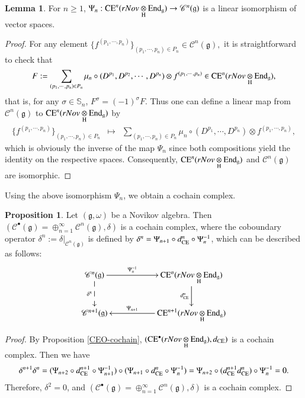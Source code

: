 \documentclass[12pt]{amsart}
\theoremstyle{definition}
\newtheorem{lem}[thm]{Lemma}
\newtheorem{pro}[thm]{Proposition}
\newcommand{\g}{\mathfrak g}
\newcommand{\End}{\mathrm{End}}
\newcommand{\ot}{\otimes}
\newcommand{\ceo}{{\rm CE}^{\bullet}}
\newcommand{\ce}{{\rm CE}}
\newcommand{\scrC}{{\mathscr{C}}}
\begin{document}
\begin{lem}\label{Psi}
For $n\geq 1$,   $\Psi_n: \ce^n(rNov\underset{\rm H}{\ot}\End_\g)\to \scrC^n(\g)$ is a linear isomorphism of vector spaces.
\end{lem}
\begin{proof}
For any element
$\bigl\{ f^{(p_1,\cdots,p_n)} \bigr\}_{(p_1,\cdots,p_n)\in P_n}\in\scrC^n(\g),$
it is straightforward to check that
$$
F:=\sum_{(p_1,\cdots,p_n)\in P_n} \mu_n\circ(D^{p_1},D^{p_2},\cdots,D^{p_n})\otimes f^{(p_1,\cdots,p_n)}\in\ce^n(rNov\underset{\rm H}{\otimes}\End_\g),
$$
that is, for any $\sigma\in\mathbb{S}_n$,
$F^\sigma=(-1)^\sigma F.$
Thus one can define a linear map from $\scrC^n(\g)$ to $\ce^n(rNov\underset{\rm H}{\ot}\End_\g)$ by
\begin{eqnarray*}
\{f^{(p_1,\cdots,p_n)}\}_{(p_1,\cdots,p_n)\in P_n}&\mapsto&\sum_{(p_1,\cdots,p_n)\in P_n} \mu_n\circ(D^{p_1},\cdots,D^{p_n})\otimes f^{(p_1,\cdots,p_n)},
\end{eqnarray*}
which is obviously the inverse of the map $\Psi_n$ since both compositions yield the identity on the respective spaces. Consequently, $\ce^n(rNov\underset{\rm H}{\ot}\End_\g)$ and $\scrC^n(\g)$ are isomorphic.
\end{proof}

Using the above isomorphism $\Psi_n$, we obtain a cochain complex.
\begin{pro}\label{scrC-cochain}
Let $(\g,\omega)$ be a Novikov algebra. Then $(\scrC^\bullet(\g)=\oplus_{n=1}^{\infty}\scrC^n(\g),\delta)$ is a cochain complex, where the coboundary operator $\delta^n:=\delta|_{\scrC^n(\g)}$ is defined by $\delta^n=\Psi_{n+1}\circ d_{\ce}^n\circ\Psi_n^{-1}$, which can be described as follows:
$$
\xymatrix{
		\text{$\scrC^n(\g)$}
		\ar[rr]^-{ \Psi_{n}^{-1}}
		\ar@{-->}[d]_-{\delta^n}
		&&\text{$\ce^n(rNov\underset{\rm H}{\otimes}\End_\g)$}
		\ar[d]_-{d^n_{\ce}}\\
		\text{$\scrC^{n+1}(\g)$}
		&&\text{$\ce^{n+1}(rNov\underset{\rm H}{\otimes}\End_\g)$}
		\ar[ll]_-{\Psi_{n+1}}}
$$
\end{pro}
\begin{proof}
By Proposition \ref{CEO-cochain}, $(\ceo(rNov\underset{\rm H}{\ot}\End_\g), d_{\rm CE})$ is a cochain complex. Then we have
\begin{align*}
&&\delta^{n+1}\delta^n&=(\Psi_{n+2}\circ d_{\ce}^{n+1}\circ\Psi_{n+1}^{-1})\circ(\Psi_{n+1}\circ d_{\ce}^n\circ\Psi_n^{-1})
=\Psi_{n+2}\circ(d^{n+1}_\ce d^n_\ce)\circ\Psi^{-1}_n
=0.
\end{align*}
Therefore, $\delta^2=0$, and $(\scrC^\bullet(\g)=\oplus_{n=1}^{\infty}\scrC^n(\g),\delta)$ is a cochain complex.
\end{proof}
 
\end{document}
